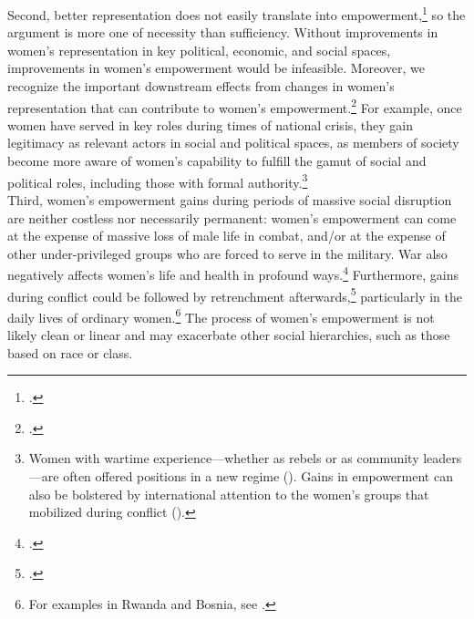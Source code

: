 \documentclass [12pt] {article}
\begin{document}
Second, better representation does not easily translate into empowerment,\footnote{.} so the argument is more one of necessity than sufficiency. Without improvements in women's representation in key political, economic, and social spaces, improvements in women's empowerment would be infeasible. Moreover, we recognize the important downstream effects from changes in women's representation that can contribute to women's empowerment.\footnote{.} For example, once women have served in key roles during times of national crisis, they gain legitimacy as relevant actors in social and political spaces, as members of society become more aware of women's capability to fulfill the gamut of social and political roles, including those with formal authority.\footnote{Women with wartime experience---whether as rebels or as community leaders---are often offered positions in a new regime (). Gains in empowerment can also be bolstered by international attention to the women's groups that mobilized during conflict ().}\\

Third, women's empowerment gains during periods of massive social disruption are neither costless nor necessarily permanent: women's empowerment can come at the expense of massive loss of male life in combat, and/or at the expense of other under-privileged groups who are forced to serve in the military. War also negatively affects women's life and health in profound ways.\footnote{.} Furthermore, gains during conflict could be followed by retrenchment afterwards,\footnote{.} particularly in the daily lives of ordinary women.\footnote{For examples in Rwanda and Bosnia, see \citet{berry2015bright,berry2018war}.} The process of women's empowerment is not likely clean or linear and may exacerbate other social hierarchies, such as those based on race or class. \\
\end{document}
